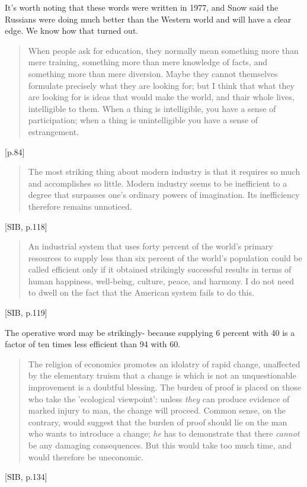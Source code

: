 It's worth noting that these words were written in 1977, and Snow said the Russians were doing much better than the Western world and will have a clear edge. We know how that turned out.

\begin{quote}
When people ask for education, they normally mean something more than mere training, something more than mere knowledge of facts, and something more than mere diversion. Maybe they cannot themselves formulate precisely what they are looking for; but I think that what they are looking for is ideas that would make the world, and thair whole lives, intelligible to them. When a thing is intelligible, you have a sense of participation; when a thing is unintelligible you have a sense of estrangement.
\end{quote}[p.84]

\begin{quote}
  The most striking thing about modern industry is that it requires so much and accomplishes so little. Modern industry seems to be inefficient to a degree that surpasses one's ordinary powers of imagination. Its inefficiency therefore remains unnoticed.
\end{quote} [SIB, p.118]

\begin{quote}
  An industrial system that uses forty percent of the world's primary resources to supply less than six percent of the world's population could be called efficient only if it obtained strikingly successful results in terms of human happiness, well-being, culture, peace, and harmony. I do not need to dwell on the fact that the American system fails to do this.
\end{quote}[SIB, p.119]

The operative word may be strikingly- because supplying 6 percent with 40 is a factor of ten times less efficient than 94 with 60.

\begin{quote}
  The religion of economics promotes an idolatry of rapid change, unaffected by the elementary truism that a change is which is not an unquestionable improvement is a doubtful blessing. The burden of proof is placed on those who take the 'ecological viewpoint': unless \textit{they} can produce evidence of marked injury to man, the change will proceed. Common sense, on the contrary, would suggest that the burden of proof should lie on the man who wants to introduce a change; \textit{he} has to demonstrate that there \textit{cannot} be any damaging consequences. But this would take too much time, and would therefore be uneconomic.
\end{quote}[SIB, p.134]

